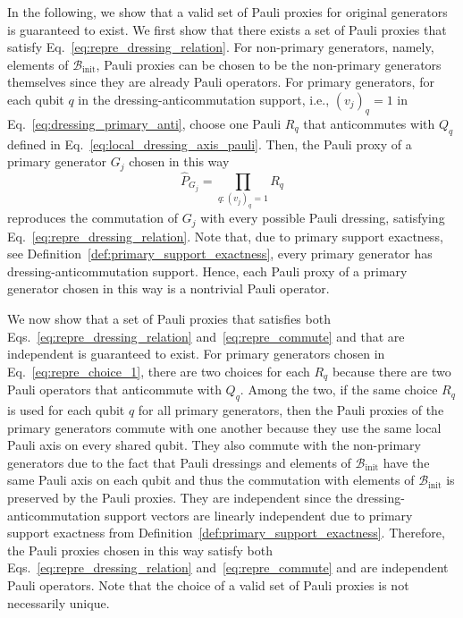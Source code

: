 \documentclass[
 reprint,
 amsmath,amssymb,
 pra,superscriptaddress, nofootinbib
]{revtex4-2}
\theoremstyle{definition}
\theoremstyle{plain}
\begin{document}
In the following, we show that a valid set of Pauli proxies for original generators is guaranteed to exist. 
We first show that there exists a set of Pauli proxies that satisfy Eq.~\eqref{eq:repre_dressing_relation}.
For non-primary generators, namely, elements of $\mathcal{B}_{\mathrm{init}}$, Pauli proxies can be chosen to be the non-primary generators themselves since they are already Pauli operators.
For primary generators, for each qubit $q$ in the dressing-anticommutation support, i.e., $(v_j)_q=1$ in Eq.~\eqref{eq:dressing_primary_anti}, choose one Pauli
$R_q$ that anticommutes with $Q_q$ defined in Eq.~\eqref{eq:local_dressing_axis_pauli}. 
Then, the Pauli proxy of a primary generator $G_j$ chosen in this way
\begin{equation}
  \hat{P}_{G_j}=\prod_{q:(v_j)_q=1} R_q
  \label{eq:repre_choice_1}
\end{equation}
reproduces the commutation of $G_j$ with every possible Pauli dressing, satisfying Eq.~\eqref{eq:repre_dressing_relation}.
Note that, due to primary support exactness, see Definition~\ref{def:primary_support_exactness}, every primary generator has dressing-anticommutation support.
Hence, each Pauli proxy of a primary generator chosen in this way is a nontrivial Pauli operator.

We now show that a set of Pauli proxies that satisfies both Eqs.~\eqref{eq:repre_dressing_relation} and~\eqref{eq:repre_commute} and that are independent is guaranteed to exist. 
For primary generators chosen in Eq.~\eqref{eq:repre_choice_1}, there are two choices for each $R_q$ because there are two Pauli operators that anticommute with $Q_q$.
Among the two, if the same choice $R_q$ is used for each qubit $q$ for all primary generators, then the Pauli proxies of the primary generators commute with one another because they use the same local Pauli axis on every shared qubit.
They also commute with the non-primary generators due to the fact that Pauli dressings and elements of $\mathcal{B}_{\mathrm{init}}$ have the same Pauli axis on each qubit and thus the commutation with elements of $\mathcal{B}_{\mathrm{init}}$ is preserved by the Pauli proxies. 
They are independent since the dressing-anticommutation support vectors are linearly independent due to primary support exactness from  Definition~\ref{def:primary_support_exactness}.
Therefore, the Pauli proxies chosen in this way satisfy both Eqs.~\eqref{eq:repre_dressing_relation} and~\eqref{eq:repre_commute} and are independent Pauli operators.
Note that the choice of a valid set of Pauli proxies is not necessarily unique.
\end{document}
